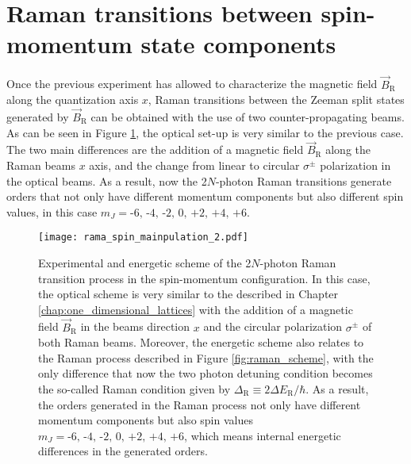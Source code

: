 \section{Raman transitions between spin-momentum state components}\label{sec:raman_manipulation_theory}

Once the previous experiment has allowed to characterize the magnetic field $\vec{B}_{\text{R}}$ along the quantization axis $x$, Raman transitions between the Zeeman split states generated by $\vec{B}_{\text{R}}$ can be obtained with the use of two counter-propagating beams. As can be seen in Figure \ref{fig:raman_manipulation}, the optical set-up is very similar to the previous case. The two main differences are the addition of a magnetic field $\vec{B}_\text{R}$ along the Raman beams $x$ axis, and the change from linear to circular $\sigma^\pm$ polarization in the optical beams. As a result, now the 2$N$-photon Raman transitions generate orders that not only have different momentum components but also different spin values, in this case $m_J = \text{-6, -4, -2, 0, +2, +4, +6}$.

\begin{figure}[!htbp]\centering
	\texttt{[image: rama\_spin\_mainpulation\_2.pdf]}
	\caption[Experimental and energetic scheme of the 2$N$-photon Raman transition process in the spin-momentum configuration]{Experimental and energetic scheme of the 2$N$-photon Raman transition process in the spin-momentum configuration. In this case, the optical scheme is very similar to the described in Chapter \ref{chap:one_dimensional_lattices} with the addition of a magnetic field $\vec{B}_\text{R}$ in the beams direction $x$ and the circular polarization $\sigma^\pm$ of both Raman beams. Moreover, the energetic scheme also relates to the Raman process described in Figure \ref{fig:raman_scheme}, with the only difference that now the two photon detuning condition becomes the so-called Raman condition given by $\Delta_\text{R} \equiv 2\Delta E_\text{R}/\hbar$. As a result, the orders generated in the Raman process not only have different momentum components but also spin values  $m_J = \text{-6, -4, -2, 0, +2, +4, +6}$, which means internal energetic differences in the generated orders. }\label{fig:raman_manipulation}
\end{figure}


